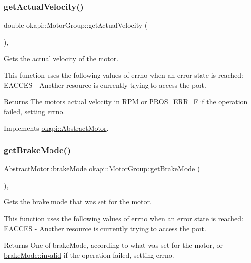 \subsubsection{\texorpdfstring{getActualVelocity()}{getActualVelocity()}}
{\footnotesize\ttfamily double okapi\+::\+Motor\+Group\+::get\+Actual\+Velocity (\begin{DoxyParamCaption}{ }\end{DoxyParamCaption})\hspace{0.3cm}{\ttfamily [override]}, {\ttfamily [virtual]}}

Gets the actual velocity of the motor.

This function uses the following values of errno when an error state is reached\+: E\+A\+C\+C\+ES -\/ Another resource is currently trying to access the port.

\begin{DoxyReturn}{Returns}
The motor\textquotesingle{}s actual velocity in R\+PM or P\+R\+O\+S\+\_\+\+E\+R\+R\+\_\+F if the operation failed, setting errno. 
\end{DoxyReturn}


Implements \mbox{\hyperlink{classokapi_1_1AbstractMotor_a45b2013cc318577fad4ac38ad22ce219}{okapi\+::\+Abstract\+Motor}}.

\mbox{\label{classokapi_1_1MotorGroup_a96fb47ca2da80930123c2b7e7176befb}} 
\subsubsection{\texorpdfstring{getBrakeMode()}{getBrakeMode()}}
{\footnotesize\ttfamily \mbox{\hyperlink{classokapi_1_1AbstractMotor_a132e0485dbb59a60c3f934338d8fa601}{Abstract\+Motor\+::brake\+Mode}} okapi\+::\+Motor\+Group\+::get\+Brake\+Mode (\begin{DoxyParamCaption}{ }\end{DoxyParamCaption})\hspace{0.3cm}{\ttfamily [override]}, {\ttfamily [virtual]}}

Gets the brake mode that was set for the motor.

This function uses the following values of errno when an error state is reached\+: E\+A\+C\+C\+ES -\/ Another resource is currently trying to access the port.

\begin{DoxyReturn}{Returns}
One of brake\+Mode, according to what was set for the motor, or \mbox{\hyperlink{classokapi_1_1AbstractMotor_a132e0485dbb59a60c3f934338d8fa601afedb2d84cafe20862cb4399751a8a7e3}{brake\+Mode\+::invalid}} if the operation failed, setting errno. 
\end{DoxyReturn}


